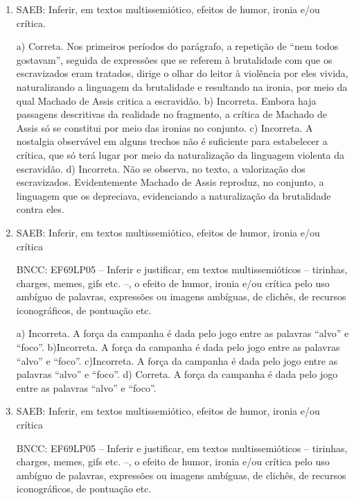 \begin{enumerate}

\item
SAEB: Inferir, em textos multissemiótico, efeitos de humor, ironia e/ou
crítica.

a) Correta. Nos primeiros períodos do parágrafo, a repetição de 
``nem todos gostavam'', seguida de expressões que se referem à brutalidade
com que os escravizados eram tratados, dirige o olhar do leitor à violência
por eles vivida, naturalizando a linguagem da brutalidade e resultando na 
ironia, por meio da qual Machado de Assis critica a escravidão.
b) Incorreta. Embora haja passagens descritivas da realidade no fragmento, 
a crítica de Machado de Assis só se constitui por meio das ironias no conjunto. 
c) Incorreta. A nostalgia observável em alguns trechos não é suficiente para
estabelecer a crítica, que só terá lugar por meio da naturalização da linguagem
violenta da escravidão. 
d) Incorreta. Não se observa, no texto, a valorização dos escravizados. Evidentemente
Machado de Assis reproduz, no conjunto, a linguagem que os depreciava, evidenciando
a naturalização da brutalidade contra eles.

\item
SAEB: Inferir, em textos multissemiótico, efeitos de humor, ironia e/ou
crítica

BNCC: EF69LP05 -- Inferir e justificar, em textos multissemióticos --
tirinhas, charges, memes, gifs etc. --, o efeito de humor, ironia e/ou
crítica pelo uso ambíguo de palavras, expressões ou imagens ambíguas, de
clichês, de recursos iconográficos, de pontuação etc.

a) Incorreta. A força da campanha é dada pelo jogo entre as palavras
``alvo'' e ``foco''.
b)Incorreta. A força da campanha é dada pelo jogo entre as palavras
``alvo'' e ``foco''.
c)Incorreta. A força da campanha é dada pelo jogo entre as palavras
``alvo'' e ``foco''.
d) Correta. A força da campanha é dada pelo jogo entre as palavras
``alvo'' e ``foco''.

\item
SAEB: Inferir, em textos multissemiótico, efeitos de humor, ironia e/ou
crítica

BNCC: EF69LP05 -- Inferir e justificar, em textos multissemióticos --
tirinhas, charges, memes, gifs etc. --, o efeito de humor, ironia e/ou
crítica pelo uso ambíguo de palavras, expressões ou imagens ambíguas, de
clichês, de recursos iconográficos, de pontuação etc.


\end{enumerate}
